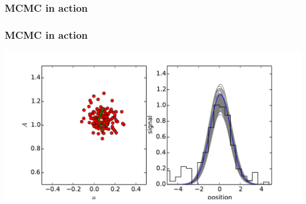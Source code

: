 \documentclass[]{beamer}
\begin{document}
\begin{frame}
  \frametitle{MCMC in action} 
\end{frame}
\begin{frame}
  \frametitle{MCMC in action} 
  \includegraphics[width=\textwidth]{movies/MCMC_1.pdf}
\end{frame}
\end{document}
